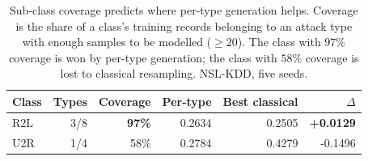 \begin{table}[t]
\centering
\caption{Sub-class coverage predicts where per-type generation helps. Coverage is the share of a class's training records belonging to an attack type with enough samples to be modelled ($\geq 20$). The class with $97\%$ coverage is won by per-type generation; the class with $58\%$ coverage is lost to classical resampling. NSL-KDD, five seeds.}
\label{tab:coverage}
\begin{tabular}{lrrrrr}
\toprule
Class & Types & Coverage & Per-type & Best classical & $\Delta$ \\
\midrule
R2L & 3/8 & \textbf{97\%} & 0.2634 & 0.2505 & \textbf{+0.0129} \\
U2R & 1/4 & {58\%} & 0.2784 & 0.4279 & {-0.1496} \\
\bottomrule
\end{tabular}
\end{table}
